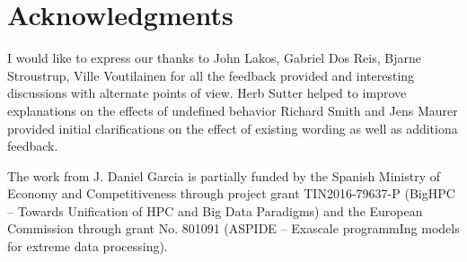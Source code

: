 \section*{Acknowledgments}

I would like to express our thanks to John Lakos, Gabriel Dos Reis, Bjarne
Stroustrup, Ville Voutilainen for all the feedback provided and interesting
discussions with alternate points of view.
Herb Sutter helped to improve explanations on the effects of undefined behavior
Richard Smith and Jens Maurer provided initial clarifications on the effect of
existing wording as well as additiona feedback.

The work from J. Daniel Garcia is partially funded by
the Spanish Ministry of Economy and Competitiveness through project grant
TIN2016-79637-P (BigHPC -- Towards Unification of HPC and Big Data Paradigms)
and the European Commission through grant
No. 801091 (ASPIDE -- Exascale programmIng models for extreme data processing).


